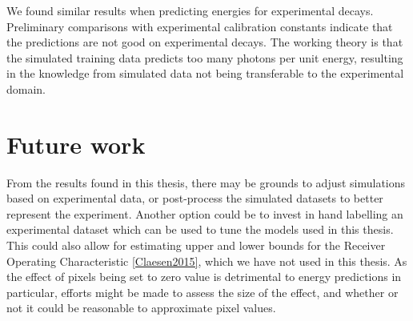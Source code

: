 We found similar results when predicting energies for experimental decays. Preliminary comparisons
with experimental calibration constants indicate that the predictions are not good on experimental
decays. The working theory is that the simulated training data predicts too many photons per unit
energy, resulting in the knowledge from simulated data not being transferable to the experimental
domain.

\section{Future work}
From the results found in this thesis, there may be grounds to adjust simulations based on
experimental data, or post-process the simulated datasets to better represent the experiment.
Another option could be to invest in hand labelling an experimental dataset which can be used
to tune the models used in this thesis. This could also allow for estimating upper and lower bounds
for the Receiver Operating Characteristic \ref{Claesen2015}, which we have not used in this thesis.
As the effect of pixels being set to zero value is detrimental to energy predictions in particular,
efforts might be made to assess the size of the effect, and whether or not it could be reasonable
to approximate pixel values.